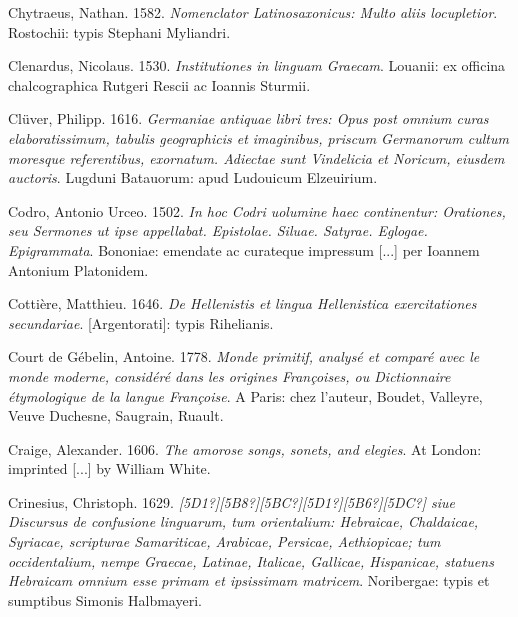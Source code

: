 \begin{styleStandard}
Chytraeus, Nathan. 1582. \textit{Nomenclator Latinosaxonicus: Multo aliis locupletior}. Rostochii: typis Stephani Myliandri.
\end{styleStandard}

\begin{styleStandard}
Clenardus, Nicolaus. 1530. \textit{Institutiones in linguam Graecam}. Louanii: ex officina chalcographica Rutgeri Rescii ac Ioannis Sturmii.
\end{styleStandard}

\begin{styleStandard}
Clüver, Philipp. 1616. \textit{Germaniae antiquae libri tres: Opus post omnium curas elaboratissimum, tabulis geographicis et imaginibus, priscum Germanorum cultum moresque referentibus, exornatum. Adiectae sunt Vindelicia et Noricum, eiusdem auctoris}. Lugduni Batauorum: apud Ludouicum Elzeuirium.
\end{styleStandard}

\begin{styleStandard}
Codro, Antonio Urceo. 1502. \textit{In hoc Codri uolumine haec continentur: Orationes, seu Sermones ut ipse appellabat. Epistolae. Siluae. Satyrae. Eglogae. Epigrammata}. Bononiae: emendate ac curateque impressum [...] per Ioannem Antonium Platonidem.
\end{styleStandard}

\begin{styleStandard}
Cottière, Matthieu. 1646. \textit{De Hellenistis et lingua Hellenistica exercitationes secundariae}. [Argentorati]: typis Rihelianis.
\end{styleStandard}

\begin{styleStandard}
Court de Gébelin, Antoine. 1778. \textit{Monde primitif, analysé et comparé avec le monde moderne, considéré dans les origines Françoises, ou Dictionnaire étymologique de la langue Françoise}. A Paris: chez l’auteur, Boudet, Valleyre, Veuve Duchesne, Saugrain, Ruault.
\end{styleStandard}

\begin{styleStandard}
Craige, Alexander. 1606. \textit{The amorose songs, sonets, and elegies}. At London: imprinted [...] by William White.
\end{styleStandard}

\begin{styleStandard}
Crinesius, Christoph. 1629. \textit{[5D1?][5B8?][5BC?][5D1?][5B6?][5DC?] siue Discursus de confusione linguarum, tum orientalium: Hebraicae, Chaldaicae, Syriacae, scripturae Samariticae, Arabicae, Persicae, Aethiopicae; tum occidentalium, nempe Graecae, Latinae, Italicae, Gallicae, Hispanicae, statuens Hebraicam omnium esse primam et ipsissimam matricem}. Noribergae: typis et sumptibus Simonis Halbmayeri.
\end{styleStandard}

